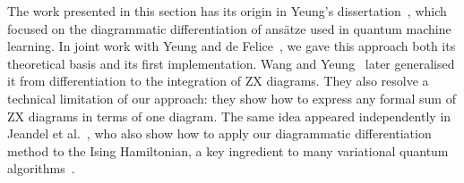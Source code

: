 The work presented in this section has its origin in Yeung's dissertation~\cite{Yeung20}, which focused on the diagrammatic differentiation of ansätze used in quantum machine learning.
In joint work with Yeung and de Felice~\cite{ToumiEtAl21a}, we gave this approach both its theoretical basis and its first implementation.
Wang and Yeung~\cite{WangYeung22} later generalised it from differentiation to the integration of ZX diagrams.
They also resolve a technical limitation of our approach: they show how to express any formal sum of ZX diagrams in terms of one diagram.
The same idea appeared independently in Jeandel et al.~\cite{JeandelEtAl22}, who also show how to apply our diagrammatic differentiation method to the Ising Hamiltonian, a key ingredient to many variational quantum algorithms~\cite{Hadfield21}.
